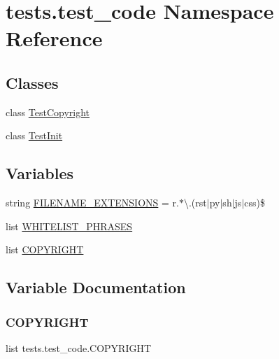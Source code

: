 \hypertarget{namespacetests_1_1test__code}{}\section{tests.\+test\+\_\+code Namespace Reference}
\label{namespacetests_1_1test__code}
\subsection*{Classes}
\begin{DoxyCompactItemize}
\item 
class \hyperlink{classtests_1_1test__code_1_1TestCopyright}{Test\+Copyright}
\item 
class \hyperlink{classtests_1_1test__code_1_1TestInit}{Test\+Init}
\end{DoxyCompactItemize}
\subsection*{Variables}
\begin{DoxyCompactItemize}
\item 
string \hyperlink{namespacetests_1_1test__code_af96de422007d15272ce083c7cb9aa199}{F\+I\+L\+E\+N\+A\+M\+E\+\_\+\+E\+X\+T\+E\+N\+S\+I\+O\+NS} = r\textquotesingle{}.$\ast$\textbackslash{}.(rst$\vert$py$\vert$sh$\vert$js$\vert$css)\$\textquotesingle{}
\item 
list \hyperlink{namespacetests_1_1test__code_a2e9ba15b1b3ff770e9bdab0abe86ef37}{W\+H\+I\+T\+E\+L\+I\+S\+T\+\_\+\+P\+H\+R\+A\+S\+ES}
\item 
list \hyperlink{namespacetests_1_1test__code_a8465cb480ec0ef3189282db9a3a85c05}{C\+O\+P\+Y\+R\+I\+G\+HT}
\end{DoxyCompactItemize}


\subsection{Variable Documentation}
\mbox{\label{namespacetests_1_1test__code_a8465cb480ec0ef3189282db9a3a85c05}} 
\subsubsection{\texorpdfstring{C\+O\+P\+Y\+R\+I\+G\+HT}{COPYRIGHT}}
{\footnotesize\ttfamily list tests.\+test\+\_\+code.\+C\+O\+P\+Y\+R\+I\+G\+HT}

